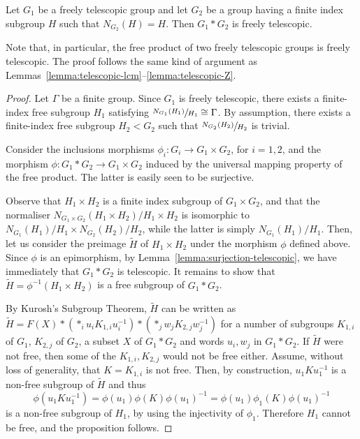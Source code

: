 \documentclass[ALCO,ThmDefs,Unicode,epreuves]{cedram}
\begin{document}
\begin{prop}
Let $G_1$ be a freely telescopic group and let $G_2$ be a group having a finite index subgroup $H$ such that $N_{G_2}(H) = H$. Then $G_1*G_2$ is freely telescopic.
\end{prop}
 
Note that, in particular, the free product of two freely telescopic groups is freely telescopic. The proof follows the same kind of argument as Lemmas~\ref{lemma:telescopic-lcm}--\ref{lemma:telescopic-Z}.
 
\begin{proof} Let $\Gamma$ be a finite group. Since $G_1$ is freely telescopic, there exists a finite-index free subgroup $H_1$ satisfying $\sfrac{N_{G_1}(H_1)}{H_1} \cong \Gamma$. By assumption, there exists a finite-index free subgroup $H_2 < G_2$ such that $\sfrac{N_{G_2}(H_2)}{H_2}$ is trivial.

Consider the inclusions morphisms ${\phi}_i:G_i \to G_1{\times}G_2$, for $i = 1, 2$, and the morphism ${\phi}:G_{1}*G_{2}\to G_{1}{\times}G_{2}$ induced by the universal mapping property of the free product. The latter is easily seen to be surjective. 

Observe that $H_1 \times H_2$ is a finite index subgroup of $G_1 \times G_2$, and that the normaliser $N_{G_{1}{\times}G_{2}}(H_{1}{\times}H_{2})/H_{1}{\times}H_{2}$ is isomorphic to $N_{G_{1}}(H_{1})/H_{1} {\times} N_{G_{2}}(H_{2})/H_{2}$, while the latter is simply $N_{G_{1}}(H_{1})/H_{1}$. Then, let us consider the preimage $\widetilde{H}$ of $H_1 \times H_2$ under the morphism $\phi$ defined above. Since $\phi$ is an epimorphism, by Lemma~\ref{lemma:surjection-telescopic}, we have immediately that $G_1 \ast G_2$ is telescopic. It remains to show that $\widetilde{H}= \phi ^{-1} ( H_1 \times H_2)$ is a free subgroup of $G_1 \ast G_2$.

By Kurosh's Subgroup Theorem, $\widetilde{H}$ can be written as $ \widetilde{H} = F(X) * (*_i u_iK_{1,i}u_i^{-1}) * (*_j w_jK_{2,j}w_j^{-1})$ for a number of subgroups $K_{1,i}$ of $G_1$, $K_{2,j}$ of $G_2$, a subset $X$ of $G_1 \ast G_2$ and words $u_i , w_j$ in $G_1 \ast G_2$. If $\widetilde{H}$ were not free, then some of the $K_{1,i} , K_{2,j}$ would not be free either. Assume, without loss of generality, that $K=K_{1,i}$ is not free. Then, by construction, $u_1 K u_1^{-1}$ is a non-free subgroup of $\widetilde{H}$ and thus
\[
\phi(u_1 K u_1^{-1}) = {\phi}(u_{1}){\phi}(K){\phi}(u_{1})^{-1} = {\phi}(u_{1}){\phi}_{1}(K){\phi}(u_{1})^{-1}
\]
is a non-free subgroup of $H_1$, by using the injectivity of ${\phi}_{1}$. Therefore $H_{1}$ cannot be free, and the proposition follows.
\end{proof}
\end{document}
